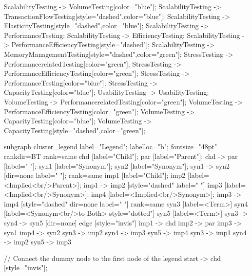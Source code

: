 \documentclass{article}
\begin{document}
{ScalabilityTesting -> VolumeTesting[color="blue"];
ScalabilityTesting -> TransactionFlowTesting[style="dashed",color="blue"];
ScalabilityTesting -> ElasticityTesting[style="dashed",color="blue"];
ScalabilityTesting -> PerformanceTesting;
ScalabilityTesting -> EfficiencyTesting;
ScalabilityTesting -> PerformanceEfficiencyTesting[style="dashed"];
ScalabilityTesting -> MemoryManagementTesting[style="dashed",color="green"];
StressTesting -> PerformancerelatedTesting[color="green"];
StressTesting -> PerformanceEfficiencyTesting[color="green"];
StressTesting -> PerformanceTesting[color="blue"];
StressTesting -> CapacityTesting[color="blue"];
UsabilityTesting -> UsabilityTesting;
VolumeTesting -> PerformancerelatedTesting[color="green"];
VolumeTesting -> PerformanceEfficiencyTesting[color="green"];
VolumeTesting -> CapacityTesting[color="blue"];
VolumeTesting -> CapacityTesting[style="dashed",color="green"];

subgraph cluster_legend {
    label="Legend";
    labelloc="b";
    fontsize="48pt"
    rankdir=BT
    {
        rank=same
        chd [label="Child"];
        par [label="Parent"];
        chd -> par [label="                "];
        syn1 [label="Synonym"];
        syn2 [label="Synonym"];
        syn1 -> syn2 [dir=none label="                "];
    }
    {
        rank=same
        imp1 [label="Child"];
        imp2 [label=<Implied<br/>Parent>];
        imp1 -> imp2 [style="dashed" label="                "]
        imp3 [label=<Implied<br/>Synonym>];
        imp4 [label=<Implied<br/>Synonym>];
        imp3 -> imp4 [style="dashed" dir=none label="                "]
    }
    {
        rank=same
        syn3 [label=<Term>]
        syn4 [label=<Synonym<br/>to Both> style="dotted"]
        syn5 [label=<Term>]
        syn3 -> syn4 -> syn5 [dir=none]
    }
    edge [style="invis"]
    imp1 -> chd
    imp2 -> par
    imp3 -> syn1
    imp4 -> syn2
syn3 -> imp2
syn4 -> imp3
syn5 -> imp4
syn3 -> imp1
syn4 -> imp2
syn5 -> imp3
}

// Connect the dummy node to the first node of the legend
start -> chd [style="invis"];
}
\end{document}
